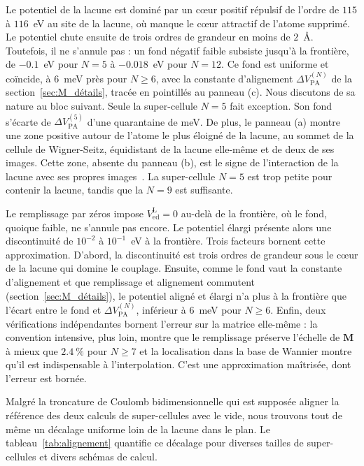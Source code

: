 Le potentiel de la lacune est dominé par un c\oe ur positif répulsif de l'ordre de $115$ à $116$~eV au site de la lacune, où manque le c\oe ur attractif de l'atome supprimé. Le potentiel chute ensuite de trois ordres de grandeur en moins de $2$~\AA{}. Toutefois, il ne s'annule pas : un fond négatif faible subsiste jusqu'à la frontière, de $-0.1$~eV pour $N=5$ à $-0.018$~eV pour $N=12$. Ce fond est uniforme et coïncide, à $6$~meV près pour $N\geq 6$, avec la constante d'alignement $\Delta V_\text{PA}^{(N)}$ de la section~\ref{sec:M_détails}, tracée en pointillés au panneau (c). Nous discutons de sa nature au bloc suivant. Seule la super-cellule $N=5$ fait exception. Son fond s'écarte de $\Delta V_\text{PA}^{(5)}$ d'une quarantaine de meV. De plus, le panneau (a) montre une zone positive autour de l'atome le plus éloigné de la lacune, au sommet de la cellule de Wigner-Seitz, équidistant de la lacune elle-même et de deux de ses images. Cette zone, absente du panneau (b), est le signe de l'interaction de la lacune avec ses propres images~\cite{freysoldtFirstprinciplesCalculationsPoint2014}. La super-cellule $N=5$ est trop petite pour contenir la lacune, tandis que la $N=9$ est suffisante.

Le remplissage par zéros impose $V_\text{ed}^\text{L} = 0$ au-delà de la frontière, où le fond, quoique faible, ne s'annule pas encore. Le potentiel élargi présente alors une discontinuité de $10^{-2}$ à $10^{-1}$~eV à la frontière. Trois facteurs bornent cette approximation. D'abord, la discontinuité est trois ordres de grandeur sous le c\oe ur de la lacune qui domine le couplage. Ensuite, comme le fond vaut la constante d'alignement et que remplissage et alignement commutent (section~\ref{sec:M_détails}), le potentiel aligné et élargi n'a plus à la frontière que l'écart entre le fond et $\Delta V_\text{PA}^{(N)}$, inférieur à $6$~meV pour $N\geq 6$. Enfin, deux vérifications indépendantes bornent l'erreur sur la matrice elle-même : la convention intensive, plus loin, montre que le remplissage préserve l'échelle de $\bm M$ à mieux que $2.4~\%$ pour $N\geq 7$ et la localisation dans la base de Wannier montre qu'il est indispensable à l'interpolation. C'est une approximation maîtrisée, dont l'erreur est bornée.

\bigskip
{}

Malgré la troncature de Coulomb bidimensionnelle qui est supposée aligner la référence des deux calculs de super-cellules avec le vide, nous trouvons tout de même un décalage uniforme loin de la lacune dans le plan. Le tableau~\ref{tab:alignement} quantifie ce décalage pour diverses tailles de super-cellules et divers schémas de calcul.

